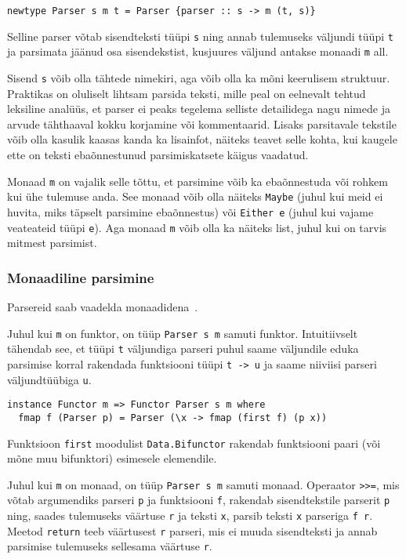 \documentclass[12pt]{article}
\begin{document}
        \begin{verbatim}newtype Parser s m t = Parser {parser :: s -> m (t, s)}\end{verbatim}

        Selline parser võtab sisendteksti tüüpi \verb!s! ning annab tulemuseks väljundi tüüpi \verb!t! ja parsimata jäänud osa sisendekstist, kusjuures väljund antakse monaadi \verb!m! all.

        Sisend \verb!s! võib olla tähtede nimekiri, aga võib olla ka mõni keerulisem struktuur. Praktikas on oluliselt lihtsam parsida teksti, mille peal on eelnevalt tehtud leksiline analüüs, et parser ei peaks tegelema selliste detailidega nagu nimede ja arvude tähthaaval kokku korjamine või kommentaarid. Lisaks parsitavale tekstile võib olla kasulik kaasas kanda ka lisainfot, näiteks teavet selle kohta, kui kaugele ette on teksti ebaõnnestunud parsimiskatsete käigus vaadatud.

        Monaad \verb!m! on vajalik selle tõttu, et parsimine võib ka ebaõnnestuda või rohkem kui ühe tulemuse anda. See monaad võib olla näiteks \verb!Maybe! (juhul kui meid ei huvita, miks täpselt parsimine ebaõnnestus) või \verb!Either e! (juhul kui vajame veateateid tüüpi \verb!e!). Aga monaad \verb!m! võib olla ka näiteks list, juhul kui on tarvis mitmest parsimist.
      \subsubsection{Monaadiline parsimine}
        Parsereid saab vaadelda monaadidena~\cite{Mon}.

        Juhul kui \verb!m! on funktor, on tüüp \verb!Parser s m! samuti funktor. Intuitiivselt tähendab see, et tüüpi \verb!t! väljundiga parseri puhul saame väljundile eduka parsimise korral rakendada funktsiooni tüüpi \verb!t -> u! ja saame niiviisi parseri väljundtüübiga \verb!u!.

        \begin{verbatim}instance Functor m => Functor Parser s m where
  fmap f (Parser p) = Parser (\x -> fmap (first f) (p x))\end{verbatim}

        Funktsioon \verb!first! moodulist \verb!Data.Bifunctor! rakendab funktsiooni paari (või mõne muu bifunktori) esimesele elemendile.

        Juhul kui \verb!m! on monaad, on tüüp \verb!Parser s m! samuti monaad. Operaator \verb!>>=!, mis võtab argumendiks parseri \verb!p! ja funktsiooni \verb!f!, rakendab sisendtekstile parserit \verb!p! ning, saades tulemuseks väärtuse \verb!r! ja teksti \verb!x!, parsib teksti \verb!x! parseriga \verb!f r!. Meetod \verb!return! teeb väärtusest \verb!r! parseri, mis ei muuda sisendteksti ja annab parsimise tulemuseks sellesama väärtuse \verb!r!.
\end{document}
